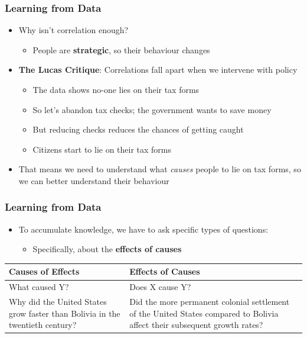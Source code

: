 \documentclass[xcolor=x11names,compress]{beamer}\usepackage[]{graphicx}\usepackage[]{color}
\renewcommand{\(}{\begin{columns}}
\renewcommand{\)}{\end{columns}}
\newcommand{\<}[1]{\begin{column}{#1}}
\renewcommand{\>}{\end{column}}
\begin{document}
\begin{frame}
\frametitle{Learning from Data}
\begin{itemize}
\item Why isn't correlation enough?
\pause
\begin{itemize}
\item People are \textbf{strategic}, so their behaviour changes
\pause
\end{itemize}
\item \textbf{The Lucas Critique}: Correlations fall apart when we intervene with policy
\begin{itemize}
\item The data shows no-one lies on their tax forms
\pause
\item So let's abandon tax checks; the government wants to save money
\pause
\item But reducing checks reduces the chances of getting caught
\pause
\item Citizens start to lie on their tax forms
\pause
\end{itemize}
\item That means we need to understand what \textit{causes} people to lie on tax forms, so we can better understand their behaviour
\end{itemize}
\end{frame}

\begin{frame}
\frametitle{Learning from Data}
\begin{itemize}
\item To accumulate knowledge, we have to ask specific types of questions:
\pause
\begin{itemize}
\item Specifically, about the \textbf{effects of causes}
\pause
\end{itemize}
\end{itemize}
\begin{table}[htbp]
  \centering
    \begin{tabular}{|>{\raggedright}p{5cm}|p{5cm}|}
    \toprule
    \textbf{Causes of Effects} & \textbf{Effects of Causes} \\
    \midrule
    What caused Y? & Does X cause Y? \\
    \midrule
    Why did the United States grow faster than Bolivia in the twentieth century? & Did the more permanent colonial settlement of the United States compared to Bolivia affect their subsequent growth rates? \\
    \bottomrule
    \end{tabular}%
  \label{tab:addlabel}%
\end{table}%
\end{frame}
\end{document}
